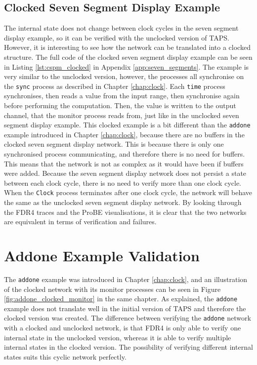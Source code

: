 \subsection{Clocked Seven Segment Display Example}
The internal state does not change between clock cycles in the seven segment display example, so it can be verified with the unclocked version of TAPS. However, it is interesting to see how the network can be translated into a clocked structure. The full \cspm{} code of the clocked seven segment display example can be seen in Listing \ref{lst:cspm_clocked} in Appendix \ref{app:seven_segments}.
The example is very similar to the unclocked version, however, the processes all synchronise on the \texttt{sync} process as described in Chapter \ref{chap:clock}. Each \texttt{time} process synchronises, then reads a value from the input range, then synchronise again before performing the computation. Then, the value is written to the output channel, that the monitor process reads from, just like in the unclocked seven segment display example. This clocked example is a bit different than the \texttt{addone} example introduced in Chapter \ref{chap:clock}, because there are no buffers in the clocked seven segment display network. This is because there is only one synchronised process communicating, and therefore there is no need for buffers. This means that the network is not as complex as it would have been if buffers were added.
Because the seven segment display network does not persist a state between each clock cycle, there is no need to verify more than one clock cycle. When the \texttt{Clock} process terminates after one clock cycle, the network will behave the same as the unclocked seven segment display network. By looking through the FDR4 traces and the ProBE visualisations, it is clear that the two networks are equivalent in terms of verification and failures.
\section{Addone Example Validation}
The \texttt{addone} example was introduced in Chapter \ref{chap:clock}, and an illustration of the clocked network with its monitor processes can be seen in Figure \ref{fig:addone_clocked_monitor} in the same chapter. As explained, the \texttt{addone} example does not translate well in the initial version of TAPS and therefore the clocked version was created.
The difference between verifying the \texttt{addone} network with a clocked and unclocked network, is that FDR4 is only able to verify one internal state in the unclocked version, whereas it is able to verify multiple internal states in the clocked version. The possibility of verifying different internal states suits this cyclic network perfectly.\\

